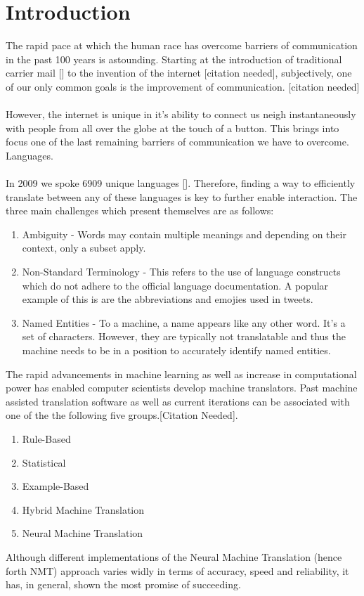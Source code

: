\documentclass[10pt,a4paper,titlepage,twoside,english]{zhawreprt}
\begin{document}
\chapter{Introduction}\label{chp:Introduction}
The rapid pace at which the human race has overcome barriers of communication in the past 100 years is astounding. Starting at the introduction of traditional carrier mail []  to the invention of the internet [citation needed], subjectively, one of  our only common goals is the improvement of communication. [citation needed] 
\\
\\
However, the internet is unique in it's ability to connect us neigh instantaneously with people from all over the globe at the touch of a button. This brings into focus one of the last remaining barriers of communication we have to overcome. Languages.
\\
\\
In 2009 we spoke 6909 unique languages []. Therefore, finding a way to efficiently translate between any of these languages is key to further enable interaction. The three main challenges which present themselves are as follows:
\begin{enumerate}
	\item Ambiguity - Words may contain multiple meanings and depending on their context, only a subset apply.
	\item Non-Standard Terminology - This refers to the use of language constructs which do not adhere to the official language documentation. A popular example of this is are the abbreviations and emojies used in tweets.
	\item Named Entities - To a machine, a name appears like any other word. It's a set of characters. However, they are typically not translatable and thus the machine needs to be in a position to accurately identify named entities. 
\end{enumerate}
The rapid advancements in machine learning as well as increase in computational power has enabled computer scientists develop machine translators. Past machine assisted translation software as well as current iterations can be associated with one of the the following five groups.[Citation Needed].

\begin{enumerate}
	
	\item Rule-Based
	\item Statistical
	\item Example-Based
	\item Hybrid Machine Translation
	\item Neural Machine Translation
	
\end{enumerate}
Although different implementations of the Neural Machine Translation (hence forth NMT) approach varies widly in terms of accuracy, speed and reliability, it has, in general, shown the most promise of succeeding.
\end{document}

